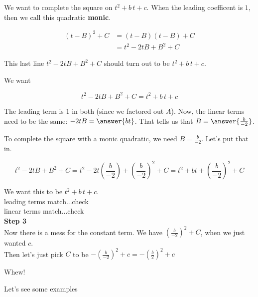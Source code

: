 \documentclass{ximera}
\begin{document}
We want to complete the square on $t^2 + b \, t + c$.  When the leading coefficent is $1$, then we call this quadratic \textbf{monic}.



\begin{align*}
(t-B)^2 + C & = (t-B)(t-B) + C \\
& = t^2 - 2 t B + B^2 + C  
\end{align*}


This last line $t^2 - 2 t B + B^2 + C$ should turn out to be $t^2 + b \, t + c$.

We want


\[   t^2 - 2 t B + B^2 + C = t^2 + b \, t + c   \]



\begin{explanation}


The leading term is $1$ in both (since we factored out $A$). Now, the linear terms need to be the same: $ - 2 t B = \answer{b t}$.  That tells us that $B = \answer{\frac{b}{-2}}$.

\end{explanation}


To complete the square with a monic quadratic, we need $B = \frac{b}{-2}$.  Let's put that in.


\[ t^2 - 2 t B + B^2 + C = t^2 - 2 t \left( \frac{b}{-2} \right) + \left(\frac{b}{-2}\right)^2 + C = t^2 + b t + \left(\frac{b}{-2}\right)^2 + C \]


We want this to be $t^2 + b \, t + c$. \\

leading terms match...check \\
linear terms match...check \\


\textbf{\textcolor{blue!75!black}{Step 3}} \\


Now there is a mess for the constant term.  We have $\left(\frac{b}{-2}\right)^2 + C$, when we just wanted $c$.  \\

Then let's just pick $C$ to be $-\left(\frac{b}{-2}\right)^2 + c = -\left(\frac{b}{2}\right)^2 + c$



Whew!

Let's see some examples
\end{document}
